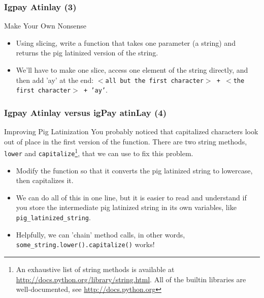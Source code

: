 \documentclass[10pt]{beamer}
\begin{document}
\begin{frame}[fragile]
  \frametitle{Igpay Atinlay (3)}
  \begin{block}{Make Your Own Nonsense}
    \begin{itemize}
      \item Using slicing, write a function that takes one parameter (a string) and returns the pig latinized version of the string.
      \item We'll have to make one slice, access one element of the string directly, and then add 'ay' at the end:
        \texttt{$<$all but the first character$>$ + $<$the first character$>$ + 'ay'}.
    \end{itemize}
  \end{block}
\end{frame}

\begin{frame}
  \frametitle{Igpay Atinlay versus igPay atinLay (4)}
  \begin{block}{Improving Pig Latinization}
    You probably noticed that capitalized characters look out of place in the first version of the function.
    There are two string methods, \texttt{lower} and \texttt{capitalize}\footnote{An exhaustive list of string methods is available at \href{http://docs.python.org/library/string.html}{http://docs.python.org/library/string.html}.  All of the builtin libraries are well-documented, see \href{http://docs.python.org}{http://docs.python.org}}, that we can use to fix this problem.
    \begin{itemize}
      \item Modify the function so that it converts the pig latinized string to lowercase, then capitalizes it.
      \item We can do all of this in one line, but it is easier to read and understand if you store the intermediate pig latinized string in its own variables, like \texttt{pig\_latinized\_string}.
      \item Helpfully, we can 'chain' method calls, in other words, \texttt{some\_string.lower().capitalize()} works!
    \end{itemize}
  \end{block}
\end{frame}
\end{document}
